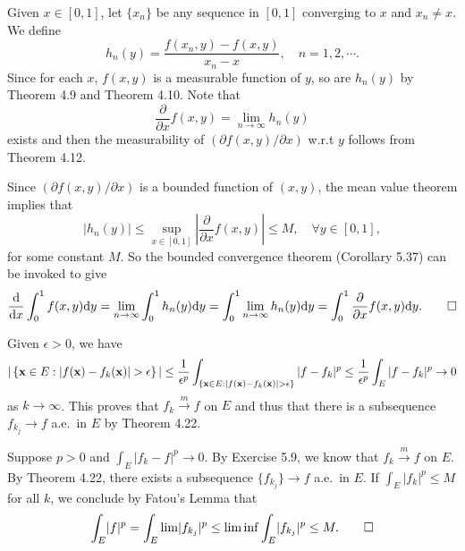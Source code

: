 \begin{exercise}{5.6}
  Given $x\in [0,1]$, let $\{x_n\}$ be any sequence in $[0,1]$ converging to $x$ and $x_n\neq x$.
  We define
  \[h_n(y)=\frac{f(x_n,y)-f(x,y)}{x_n-x},\quad n=1,2,\cdots.\]
  Since for each $x$, $f(x,y)$ is a measurable function of $y$,
  so are $h_n(y)$ by Theorem 4.9 and Theorem 4.10.
  Note that
  \[\frac{\partial}{\partial x}f(x,y)=\lim_{n\to\infty}h_n(y)\] exists
  and then the measurability of $(\partial f(x,y)/\partial x)$ w.r.t $y$ follows from Theorem 4.12.

  Since $(\partial f(x,y)/\partial x)$ is a bounded function of $(x,y)$,
  the mean value theorem implies that
  \[|h_n(y)|\leq \sup_{x\in[0,1]}\left|\frac{\partial}{\partial x}f(x,y)\right|\leq M, \quad\forall y\in[0,1],\]
  for some constant $M$.
  So the bounded convergence theorem (Corollary 5.37) can be invoked to give
  \[\frac{\mathrm{d}}{\mathrm{d} x}\int_0^1f(x,y)\mathrm{d} y=\lim_{n\to\infty}\int_0^1h_n(y)\mathrm{d} y=\int_0^1\lim_{n\to\infty}h_n(y)\mathrm{d} y=\int_0^1\frac{\partial}{\partial x}f(x,y)\mathrm{d} y.
  \qedhere\]
\end{exercise}

\begin{exercise}{5.9}
  Given $\epsilon>0$, we have
  \[|\left\{\bfx\in E:|f(\bfx)-f_k(\bfx)|>\epsilon\right\}|\leq\frac{1}{\epsilon^p}\int_{\{\bfx\in E:|f(\bfx)-f_k(\bfx)|>\epsilon\}}|f-f_k|^p\leq\frac{1}{\epsilon^p}\int_E|f-f_k|^p \to 0 \]
  as $k\to\infty$.
  This proves that $f_k\overset{m}{\longrightarrow} f$ on $E$ and thus
  that there is a subsequence $f_{k_j}\to f$ a.e.\ in $E$ by Theorem 4.22.
\end{exercise}

\begin{exercise}{5.10}
  Suppose $p > 0$ and $\int_E \lvert f_k - f \rvert^p \rightarrow 0$.
  By Exercise 5.9, we know that $f_k \xrightarrow{m} f$ on $E$.
  By Theorem 4.22, there exists a subsequence $\{f_{k_j}\} \rightarrow f$ a.e.\ in $E$.
  If $\int_E \lvert f_k \rvert^p \le M$ for all $k$,
  we conclude by Fatou's Lemma that
  \[
    \int_E \lvert f \rvert^p = \int_E \lim \lvert f_{k_j} \rvert^p
    \le \liminf \int_E \lvert f_{k_j} \rvert^p \le M.
    \qedhere
  \]
\end{exercise}


